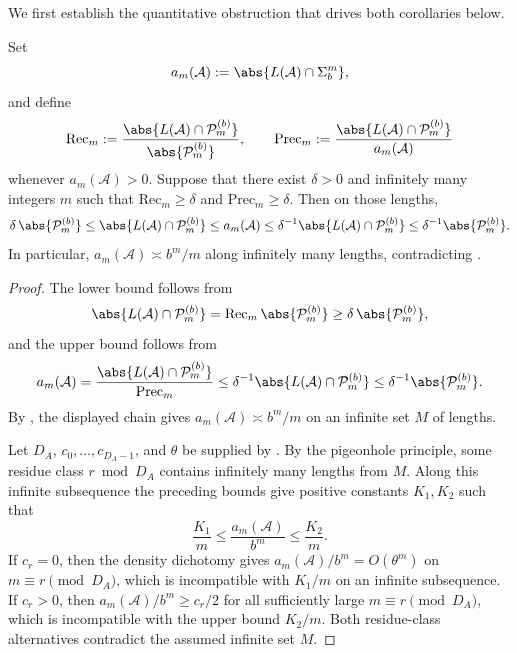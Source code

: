 We first establish the quantitative obstruction that drives both
corollaries below.

\begin{proposition}
  \label{prop:dfa-quantitative-obstruction}
  Set
  \[
    a_m(\mathcal A):=\abs{L(\mathcal A)\cap\Sigma_b^m},
  \]
  and define
  \[
    \mathrm{Rec}_m
    :=\frac{\abs{L(\mathcal A)\cap\mathcal P_m^{(b)}}}{\abs{\mathcal P_m^{(b)}}},
    \qquad
    \mathrm{Prec}_m
    :=\frac{\abs{L(\mathcal A)\cap\mathcal P_m^{(b)}}}{a_m(\mathcal A)}
  \]
  whenever \(a_m(\mathcal A)>0\). Suppose that there exist \(\delta>0\)
  and infinitely many integers \(m\) such that
  \(\mathrm{Rec}_m\ge \delta\) and \(\mathrm{Prec}_m\ge \delta\). Then
  on those lengths,
  \[
    \delta\,\abs{\mathcal P_m^{(b)}}
    \le \abs{L(\mathcal A)\cap\mathcal P_m^{(b)}}
    \le a_m(\mathcal A)
    \le \delta^{-1}\abs{L(\mathcal A)\cap\mathcal P_m^{(b)}}
    \le \delta^{-1}\abs{\mathcal P_m^{(b)}}.
  \]
  In particular, \(a_m(\mathcal A)\asymp b^m/m\) along infinitely many
  lengths, contradicting .
\end{proposition}

\begin{proof}
  The lower bound follows from
  \[
    \abs{L(\mathcal A)\cap\mathcal P_m^{(b)}}
    =\mathrm{Rec}_m\,\abs{\mathcal P_m^{(b)}}
    \ge \delta\,\abs{\mathcal P_m^{(b)}},
  \]
  and the upper bound follows from
  \[
    a_m(\mathcal A)
    =\frac{\abs{L(\mathcal A)\cap\mathcal P_m^{(b)}}}{\mathrm{Prec}_m}
    \le \delta^{-1}\abs{L(\mathcal A)\cap\mathcal P_m^{(b)}}
    \le \delta^{-1}\abs{\mathcal P_m^{(b)}}.
  \]
  By , the displayed chain gives
  \(a_m(\mathcal A)\asymp b^m/m\) on an infinite set \(M\) of lengths.

  Let \(D_A\), \(c_0,\dots,c_{D_A-1}\), and \(\theta\) be supplied by
  . By the pigeonhole principle, some
  residue class \(r\bmod D_A\) contains infinitely many lengths from
  \(M\). Along this infinite subsequence the preceding bounds give
  positive constants \(K_1,K_2\) such that
  \[
    \frac{K_1}{m}\le \frac{a_m(\mathcal A)}{b^m}
    \le \frac{K_2}{m}.
  \]
  If \(c_r=0\), then the density dichotomy gives
  \(a_m(\mathcal A)/b^m=O(\theta^m)\) on \(m\equiv r\pmod {D_A}\), which is
  incompatible with \(K_1/m\) on an infinite subsequence. If \(c_r>0\),
  then \(a_m(\mathcal A)/b^m\ge c_r/2\) for all sufficiently large
  \(m\equiv r\pmod {D_A}\), which is incompatible with the upper bound
  \(K_2/m\). Both residue-class alternatives contradict the assumed
  infinite set \(M\).
\end{proof}

